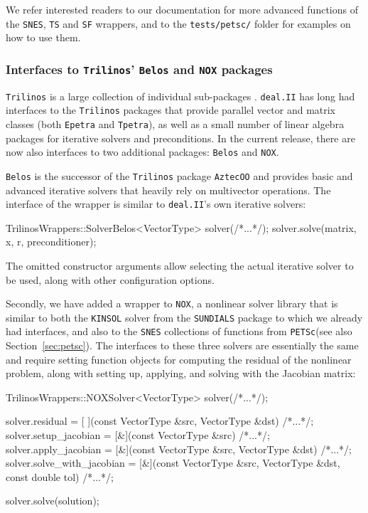 \documentclass{ansarticle-preprint}
\newcommand{\specialword}[1]{\texttt{#1}}
\newcommand{\dealii}{{\specialword{deal.II}}\xspace}
\newcommand{\trilinos}{{\specialword{Trilinos}}\xspace}
\newcommand{\petsc}{\specialword{PETSc}\xspace}
\newcommand{\snes}{{\specialword{SNES}}\xspace}
\newcommand{\ts}{{\specialword{TS}}\xspace}
\newcommand{\petscsf}{{\specialword{SF}}\xspace}
\newcommand{\sundials}{{\specialword{SUNDIALS}}\xspace}
\newcommand{\kinsol}{{\specialword{KINSOL}}\xspace}
\begin{document}
We refer interested readers to our documentation for more advanced
functions of the \snes, \ts and \petscsf wrappers, and to the {\tt tests/petsc/} folder
for examples on how to use them.


\subsubsection{Interfaces to \trilinos{}' \texttt{Belos} and \texttt{NOX} packages}\label{sec:trilinos}

\trilinos is a large collection of individual sub-packages \cite{heroux2005trilinos,trilinos-web-page}. \dealii{}
has long had interfaces to the \trilinos packages that provide parallel
vector and matrix classes (both \texttt{Epetra} and \texttt{Tpetra}),
as well as a small number of linear algebra packages for iterative
solvers and preconditions. In the current release, there are now also
interfaces to two additional packages: \texttt{Belos} and \texttt{NOX}.

\texttt{Belos} is the
successor of the \trilinos package \texttt{AztecOO} and provides basic and advanced iterative solvers
that heavily rely on multivector operations. The interface of the
wrapper is similar to \dealii{}'s own iterative solvers:
\begin{c++}
TrilinosWrappers::SolverBelos<VectorType> solver(/*...*/);
solver.solve(matrix, x, r, preconditioner);
\end{c++}
The omitted constructor arguments allow selecting the actual iterative
solver to be used, along with other configuration options.

Secondly, we have added a wrapper to \texttt{NOX}, a
nonlinear solver library that is similar to both the \kinsol{} solver from
the \sundials{} package to which we already had interfaces, and also
to the \snes{} collections of functions from \petsc (see also
Section~\ref{sec:petsc}). The interfaces to these three solvers are
essentially the same and require setting function objects for
computing the residual of the nonlinear problem, along with setting
up, applying, and solving with the Jacobian matrix:
\begin{c++}
TrilinosWrappers::NOXSolver<VectorType> solver(/*...*/);

solver.residual            = [ ](const VectorType &src,
                                 VectorType       &dst) {/*...*/};
solver.setup_jacobian      = [&](const VectorType &src) {/*...*/};
solver.apply_jacobian      = [&](const VectorType &src,
                                 VectorType       &dst) {/*...*/};
solver.solve_with_jacobian = [&](const VectorType &src,
                                 VectorType       &dst,
                                 const double      tol) {/*...*/};

solver.solve(solution);
\end{c++}
\end{document}
